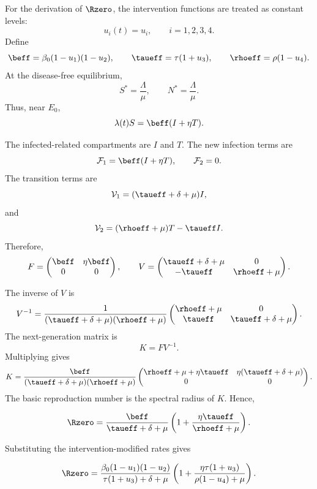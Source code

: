 For the derivation of $\Rzero$, the intervention functions are treated as constant levels:
\[
u_i(t)=u_i,\qquad i=1,2,3,4.
\]
Define
\[
\beff=\beta_0(1-u_1)(1-u_2),\qquad
\taueff=\tau(1+u_3),\qquad
\rhoeff=\rho(1-u_4).
\]
At the disease-free equilibrium,
\[
S^*=\frac{\Lambda}{\mu},
\qquad
N^*=\frac{\Lambda}{\mu}.
\]
Thus, near $E_0$,
\[
\lambda(t)S
=
\beff(I+\eta T).
\]

The infected-related compartments are $I$ and $T$. The new infection terms are
\[
\mathcal{F}_1=\beff(I+\eta T),
\qquad
\mathcal{F}_2=0.
\]
The transition terms are
\[
\mathcal{V}_1=(\taueff+\delta+\mu)I,
\]
and
\[
\mathcal{V}_2=(\rhoeff+\mu)T-\taueff I.
\]
Therefore,
\[
F=
\begin{pmatrix}
\beff & \eta\beff\\
0&0
\end{pmatrix},
\qquad
V=
\begin{pmatrix}
\taueff+\delta+\mu & 0\\
-\taueff & \rhoeff+\mu
\end{pmatrix}.
\]

The inverse of $V$ is
\[
V^{-1}=
\frac{1}{(\taueff+\delta+\mu)(\rhoeff+\mu)}
\begin{pmatrix}
\rhoeff+\mu & 0\\
\taueff & \taueff+\delta+\mu
\end{pmatrix}.
\]
The next-generation matrix is
\[
K=FV^{-1}.
\]
Multiplying gives
\[
K=
\frac{\beff}{(\taueff+\delta+\mu)(\rhoeff+\mu)}
\begin{pmatrix}
\rhoeff+\mu+\eta\taueff &
\eta(\taueff+\delta+\mu)\\
0&0
\end{pmatrix}.
\]
The basic reproduction number is the spectral radius of $K$. Hence,
\begin{mathbox}
\begin{equation}
\Rzero=
\frac{\beff}{\taueff+\delta+\mu}
\left(
1+\frac{\eta\taueff}{\rhoeff+\mu}
\right).
\label{eq:R0_general_eff}
\end{equation}
\end{mathbox}
Substituting the intervention-modified rates gives
\begin{mathbox}
\begin{equation}
\Rzero=
\frac{\beta_0(1-u_1)(1-u_2)}
{\tau(1+u_3)+\delta+\mu}
\left(
1+\frac{\eta\tau(1+u_3)}
{\rho(1-u_4)+\mu}
\right).
\label{eq:R0_intervention_final}
\end{equation}
\end{mathbox}

